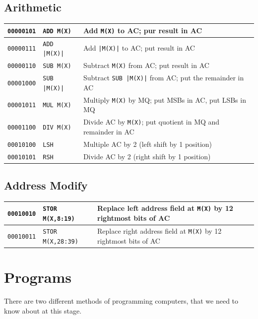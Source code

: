 \subsection*{Arithmetic}
\begin{table}[H]
    \begin{tabularx}{\textwidth}{XXX}
        \hline
        \texttt{00000101} & \texttt{ADD M(X)} & Add \texttt{M(X)} to AC; pur result in AC\\
        \hline
        \texttt{00000111} & \texttt{ADD |M(X)|} & Add \texttt{|M(X)|} to AC; put result in AC\\
        \hline
        \texttt{00000110} & \texttt{SUB M(X)} & Subtract \texttt{M(X)} from AC; put result in AC\\
        \hline
        \texttt{00001000} & \texttt{SUB |M(X)|} & Subtract \texttt{SUB |M(X)|} from AC; put the remainder in AC\\
        \hline
        \texttt{00001011} & \texttt{MUL M(X)} & Multiply \texttt{M(X)} by MQ; put MSBs in AC, put LSBs in MQ\\
        \hline
        \texttt{00001100} & \texttt{DIV M(X)} & Divide AC by \texttt{M(X)}; put quotient in MQ and remainder in AC\\
        \hline
        \texttt{00010100} & \texttt{LSH} & Multiple AC by 2 (left shift by 1 position)\\
        \hline
        \texttt{00010101} & \texttt{RSH} & Divide AC by 2 (right shift by 1 position)\\
        \hline
    \end{tabularx}
\end{table}

\subsection*{Address Modify}
\begin{table}[H]
    \begin{tabularx}{\textwidth}{XXX}
        \hline
        \texttt{00010010} & \texttt{STOR M(X,8:19)} & Replace left address field at \texttt{M(X)} by 12 rightmost bits of AC\\
        \hline
        \texttt{00010011} & \texttt{STOR M(X,28:39)} & Replace right address field at \texttt{M(X)} by 12 rightmost bits of AC\\
        \hline        
    \end{tabularx}
\end{table}


\section*{Programs}
There are two different methods of programming computers, that we need to know about at this stage.
